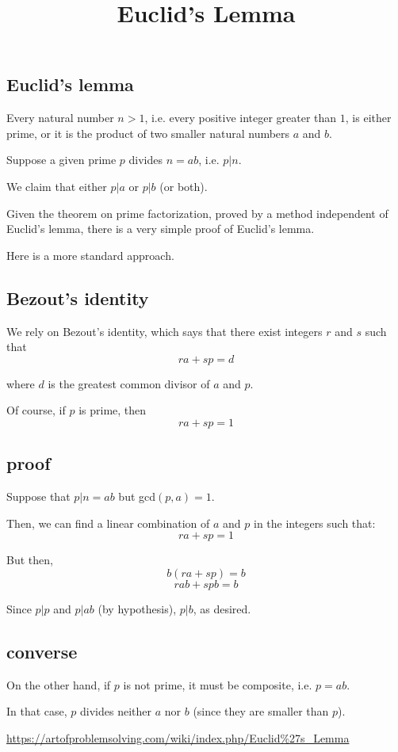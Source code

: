 \documentclass[11pt, oneside]{article}
\title{Euclid's Lemma}
\date{}
\begin{document}
\maketitle
\Large

\subsection*{Euclid's lemma}

Every natural number $n > 1$, i.e. every positive integer greater than $1$, is either prime, or it is the product of two smaller natural numbers $a$ and $b$.

Suppose a given prime $p$ divides $n = ab$, i.e. $p|n$.

We claim that either $p|a$ or  $p|b$ (or both).

Given the theorem on prime factorization, proved by a method independent of Euclid's lemma, there is a very simple proof of Euclid's lemma.

Here is a more standard approach.

\subsection*{Bezout's identity}

We rely on Bezout's identity, which says that there exist integers $r$ and $s$ such that
\[ ra + sp = d \]

where $d$ is the greatest common divisor of $a$ and $p$.

Of course, if $p$ is prime, then
\[ ra + sp = 1 \]

\subsection*{proof}

Suppose that $p|n = ab$ but gcd$(p,a) = 1$.

Then, we can find a linear combination of $a$ and $p$ in the integers such that:
\[ ra + sp = 1 \]

But then, 
\[ b(ra + sp) = b \]
\[ rab + spb = b \]

Since $p|p$ and $p|ab$ (by hypothesis), $p|b$, as desired.

\subsection*{converse}
On the other hand, if $p$ is not prime, it must be composite, i.e. $p=ab$.  

In that case, $p$ divides neither $a$ nor $b$ (since they are smaller than $p$).  

\url{https://artofproblemsolving.com/wiki/index.php/Euclid%27s_Lemma}
\end{document}
